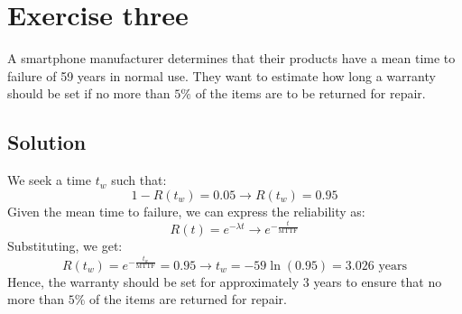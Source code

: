 \section{Exercise three}

A smartphone manufacturer determines that their products have a mean time to failure of 59 years in normal use.
They want to estimate how long a warranty should be set if no more than $5\%$ of the items are to be returned for repair.

\subsection*{Solution}
We seek a time $t_w$ such that:
\[1-R(t_w)=0.05\rightarrow R(t_w)=0.95\]
Given the mean time to failure, we can express the reliability as:
\[R(t)=e^{-\lambda t}\rightarrow e^{-\frac{t}{\text{MTTF}}}\]
Substituting, we get:
\[R(t_w)=e^{-\frac{t_w}{\text{MTTF}}}=0.95\rightarrow t_w=-59\ln(0.95)=3.026 \text{ years}\]
Hence, the warranty should be set for approximately 3 years to ensure that no more than $5\%$ of the items are returned for repair.